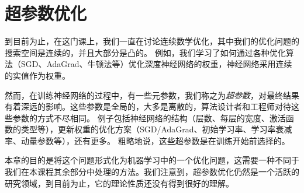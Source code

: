 

\chapter{
	超参数优化
	} 

到目前为止，在这门课上，我们一直在讨论连续数学优化，其中我们的优化问题的搜索空间是连续的，并且大部分是凸的。
例如，我们学习了如何通过各种优化算法（SGD、AdaGrad、牛顿法等）优化深度神经网络的权重，神经网络采用连续的实值作为权重。

然而，在训练神经网络的过程中，有一些元参数，我们称之为\emph{超参数}，对最终结果有着深远的影响。这些参数是全局的，大多是离散的，算法设计者和工程师对待这些参数的方式不尽相同。
例子包括神经网络的结构（层数、每层的宽度、激活函数的类型等），更新权重的优化方案（SGD/AdaGrad、初始学习率、学习率衰减率、动量参数等），还有更多。
粗略地说，这些超参数是在训练开始前选择的。

本章的目的是将这个问题形式化为机器学习中的一个优化问题，这需要一种不同于我们在本课程其余部分中处理的方法。我们注意到，超参数优化仍然是一个活跃的研究领域，到目前为止，它的理论性质还没有得到很好的理解。


